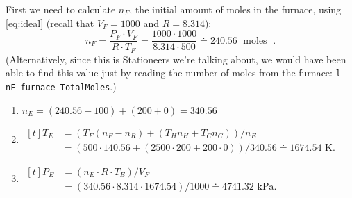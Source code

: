 \documentclass{article}
\DeclareMathOperator{\CDiox}{\mathrm{CO}_2}
\begin{document}
\begin{example}
    First we need to calculate $n_F$, the initial amount of moles in the furnace, using
    \autoref{eq:ideal} (recall that $V_F=1000$ and $R=8.314$):
    \[
        n_F
        = \frac{P_F\cdot V_F}{R\cdot T_F}
        = \frac{1000\cdot 1000}{8.314\cdot 500}
        \doteq 240.56 \text{ moles $\CDiox$}.
    \]
    (Alternatively, since this is Stationeers we're talking about, we would have been able to
    find this value just by reading the number of moles from the furnace:
    \texttt{l nF furnace TotalMoles}.)
    \begin{example}[$n_R=100$, $n_H=200$ and $n_C=0$]
        \phantom{ }
        \begin{enumerate}[label=(\alph*)]
            \item
                \begin{math}
                    n_E=(240.56-100)+(200+0)=340.56
                \end{math}
            \item
                \begin{math}
                    \begin{aligned}[t]
                        T_E
                        &= (T_F(n_F-n_R)+(T_H n_H+T_C n_C))/n_E \\
                        &= (500\cdot 140.56+(2500\cdot 200+200\cdot 0))/340.56
                        \doteq 1674.54\text{ K}.
                    \end{aligned}
                \end{math}
            \item
                \begin{math}
                    \begin{aligned}[t]
                        P_E
                        &= (n_E\cdot R\cdot T_E)/V_F \\
                        &= (340.56\cdot 8.314\cdot 1674.54)/1000
                        \doteq 4741.32\text{ kPa}.
                    \end{aligned}
                \end{math}
        \end{enumerate}
    \end{example}

\end{example}
\end{document}
